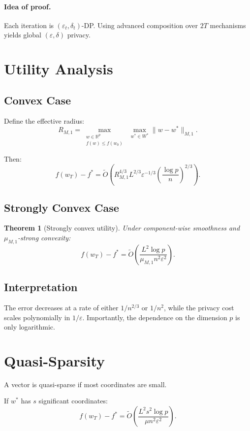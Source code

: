 \documentclass[11pt,a4paper]{article}
\newtheorem{theorem}{Theorem}
\begin{document}
\paragraph{Idea of proof.}
Each iteration is $(\varepsilon_t, \delta_t)$-DP. Using advanced composition over $2T$ mechanisms yields global $(\varepsilon, \delta)$ privacy.

\section{Utility Analysis}

\subsection{Convex Case}

Define the effective radius:
\[
R_{M,1} = \max_{\substack{w \in \mathbb{R}^p \\ f(w) \le f(w_0)}} \; \max_{w^* \in W^*} \|w - w^*\|_{M,1}.
\]

Then:
\[
f(w_T) - f^* =
\widetilde{O}\left(
R_{M,1}^{4/3} L^{2/3} \varepsilon^{-1/3}
\left(\frac{\log p}{n}\right)^{2/3}
\right).
\]

\subsection{Strongly Convex Case}

\begin{theorem}[Strongly convex utility]
Under component-wise smoothness and $\mu_{M,1}$-strong convexity:
\[
f(w_T) - f^* =
\widetilde{O}\left(
\frac{L^2 \log p}{\mu_{M,1} n^2 \varepsilon^2}
\right).
\]
\end{theorem}

\subsection{Interpretation}

The error decreases at a rate of either \(1/n^{2/3}\) or \(1/n^2\), while the privacy cost scales polynomially in \(1/\varepsilon\). Importantly, the dependence on the dimension \(p\) is only logarithmic.
\section{Quasi-Sparsity}

A vector is quasi-sparse if most coordinates are small.

If $w^*$ has $s$ significant coordinates:
\[
f(w_T) - f^* =
\widetilde{O}\left(
\frac{L^2 s^2 \log p}{\mu n^2 \varepsilon^2}
\right).
\]
\end{document}

